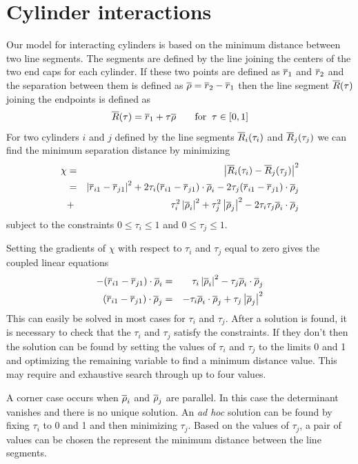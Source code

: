 \documentclass[12pt]{article}
\begin{document}
\section{Cylinder interactions}
Our model for interacting cylinders is based on the minimum distance between two
line segments. The segments are defined by the line joining the centers of the two
end caps for each cylinder. If these two points are defined as $\overline{r}_1$ and $\overline{r}_2$
and the separation between them is defined as $\overline{\rho} = \overline{r}_2-\overline{r}_1$ then the line
segment $\overline{R}(\tau)$ joining the endpoints is defined as
\[
\overline{R}(\tau) = \overline{r}_1 +\tau\overline{\rho}\;\;\;\;\;\;\;\mbox{for}\;\;\tau\in [0,1]
\]
For two cylinders $i$ and $j$ defined by the line segments $\overline{R}_i(\tau_i)$ and
$\overline{R}_j(\tau_j)$ we can find the minimum separation distance by minimizing
\begin{eqnarray*}
\chi & = & \left|\overline{R}_i(\tau_i)-\overline{R}_j(\tau_j)\right|^2 \\
     & = & \left|\overline{r}_{i1}-\overline{r}_{j1}\right|^2+2\tau_i(\overline{r}_{i1}-\overline{r}_{j1})\cdot\overline{\rho}_i
          -2\tau_j(\overline{r}_{i1}-\overline{r}_{j1})\cdot\overline{\rho}_j \\
     & + & \tau_i^2\left|\overline{\rho}_i\right|^2 + \tau_j^2\left|\overline{\rho}_j\right|^2
           - 2\tau_i\tau_j\overline{\rho}_i\cdot\overline{\rho}_j
\end{eqnarray*}
subject to the constraints $0\le\tau_i\le 1$ and $0\le\tau_j\le 1$.

Setting the gradients of $\chi$ with respect to $\tau_i$ and $\tau_j$ equal to
zero gives the coupled linear equations
\begin{eqnarray*}
-(\overline{r}_{i1}-\overline{r}_{j1})\cdot\overline{\rho}_i & = & \tau_i\left|\overline{\rho}_i\right|^2
                                        - \tau_j\overline{\rho}_i\cdot\overline{\rho}_j \\
(\overline{r}_{i1}-\overline{r}_{j1})\cdot\overline{\rho}_j & = & - \tau_i\overline{\rho}_i\cdot\overline{\rho}_j
                                       + \tau_j\left|\overline{\rho}_j\right|^2
\end{eqnarray*}
This can easily be solved in most cases for $\tau_i$ and $\tau_j$.
After a solution is found, it is necessary to check that the $\tau_i$ and $\tau_j$
satisfy the constraints. If they don't then the solution can be found by setting the
values of $\tau_i$ and $\tau_j$ to the limits 0 and 1 and optimizing the remaining
variable to find a minimum distance value. This may require and exhaustive search through
up to four values.

A corner case occurs when $\overline{\rho}_i$ and $\overline{\rho}_j$ are parallel. In this case the
determinant vanishes and there is no unique solution. An {\em ad hoc} solution can be
found by fixing $\tau_i$ to 0 and 1 and then minimizing $\tau_j$. Based on the values
of $\tau_j$, a pair of values can be chosen the represent the minimum distance between
the line segments.
\end{document}
